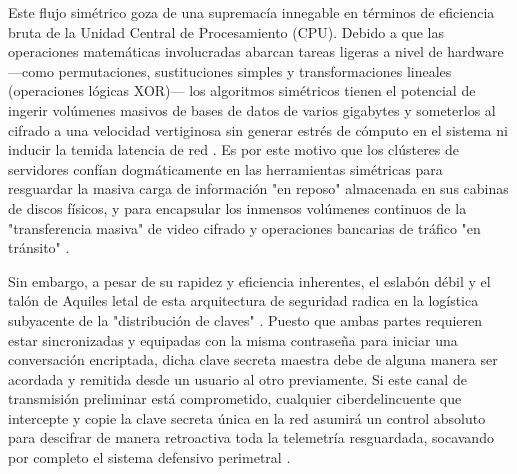 \documentclass[a4paper,12pt]{article}
\begin{document}
Este flujo simétrico goza de una supremacía innegable en términos de eficiencia bruta de la Unidad Central de Procesamiento (CPU). Debido a que las operaciones matemáticas involucradas abarcan tareas ligeras a nivel de hardware —como permutaciones, sustituciones simples y transformaciones lineales (operaciones lógicas XOR)— los algoritmos simétricos tienen el potencial de ingerir volúmenes masivos de bases de datos de varios gigabytes y someterlos al cifrado a una velocidad vertiginosa sin generar estrés de cómputo en el sistema ni inducir la temida latencia de red \cite{keyfactor_sym, encrypt_sym}. Es por este motivo que los clústeres de servidores confían dogmáticamente en las herramientas simétricas para resguardar la masiva carga de información "en reposo" almacenada en sus cabinas de discos físicos, y para encapsular los inmensos volúmenes continuos de la "transferencia masiva" de video cifrado y operaciones bancarias de tráfico "en tránsito" \cite{keyfactor_sym, ibm_crypto_types}.

Sin embargo, a pesar de su rapidez y eficiencia inherentes, el eslabón débil y el talón de Aquiles letal de esta arquitectura de seguridad radica en la logística subyacente de la "distribución de claves" \cite{encrypt_sym}. Puesto que ambas partes requieren estar sincronizadas y equipadas con la misma contraseña para iniciar una conversación encriptada, dicha clave secreta maestra debe de alguna manera ser acordada y remitida desde un usuario al otro previamente. Si este canal de transmisión preliminar está comprometido, cualquier ciberdelincuente que intercepte y copie la clave secreta única en la red asumirá un control absoluto para descifrar de manera retroactiva toda la telemetría resguardada, socavando por completo el sistema defensivo perimetral \cite{keyfactor_sym, encrypt_sym}.
\end{document}
